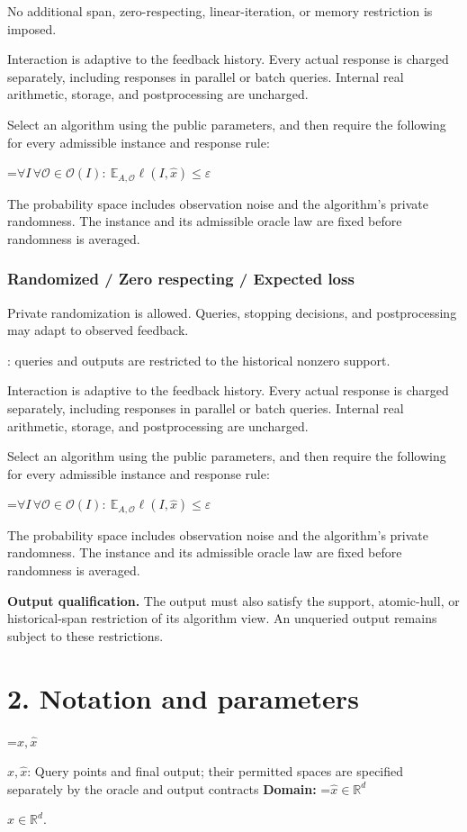\documentclass[10pt,a4paper]{article}
\newcommand{\AtlasMath}[1]{\par\begingroup\centering\setbox0=\hbox{$\displaystyle #1$}\ifdim\wd0>1.4\linewidth\typeout{ATLAS WIDE FORMULA: \the\wd0}\fi\ifdim\wd0>\linewidth\resizebox{\linewidth}{!}{\box0}\else\box0\fi\par\endgroup}
\newcommand{\AtlasInlineMath}[1]{\begingroup\setbox0=\hbox{$#1$}\ifdim\wd0>.4\linewidth\endgroup\AtlasMath{#1}\else\endgroup$#1$\fi}
\begin{document}
No additional span, zero-respecting, linear-iteration, or memory restriction is imposed.

Interaction is adaptive to the feedback history. Every actual response is charged separately, including responses in parallel or batch queries. Internal real arithmetic, storage, and postprocessing are uncharged.

Select an algorithm using the public parameters, and then require the following for every admissible instance and response rule:


\AtlasMath{\forall I\,\forall\mathcal{O}\in\mathcal{O}(I):\ \mathbb{E}_{A,\mathcal{O}}\ell(I,\widehat{x})\le\varepsilon}


The probability space includes observation noise and the algorithm's private randomness. The instance and its admissible oracle law are fixed before randomness is averaged.

\subsubsection{Randomized / Zero respecting / Expected loss}
Private randomization is allowed. Queries, stopping decisions, and postprocessing may adapt to observed feedback.

: queries and outputs are restricted to the historical nonzero support.

Interaction is adaptive to the feedback history. Every actual response is charged separately, including responses in parallel or batch queries. Internal real arithmetic, storage, and postprocessing are uncharged.

Select an algorithm using the public parameters, and then require the following for every admissible instance and response rule:


\AtlasMath{\forall I\,\forall\mathcal{O}\in\mathcal{O}(I):\ \mathbb{E}_{A,\mathcal{O}}\ell(I,\widehat{x})\le\varepsilon}


The probability space includes observation noise and the algorithm's private randomness. The instance and its admissible oracle law are fixed before randomness is averaged.

\textbf{Output qualification.} The output must also satisfy the support, atomic-hull, or historical-span restriction of its algorithm view. An unqueried output remains subject to these restrictions.

\section{2. Notation and parameters}
\AtlasInlineMath{x,\widehat{x}}: Query points and final output; their permitted spaces are specified separately by the oracle and output contracts \textbf{Domain:} \AtlasInlineMath{\widehat{x}\in \mathbb{R}^d}.
\end{document}
